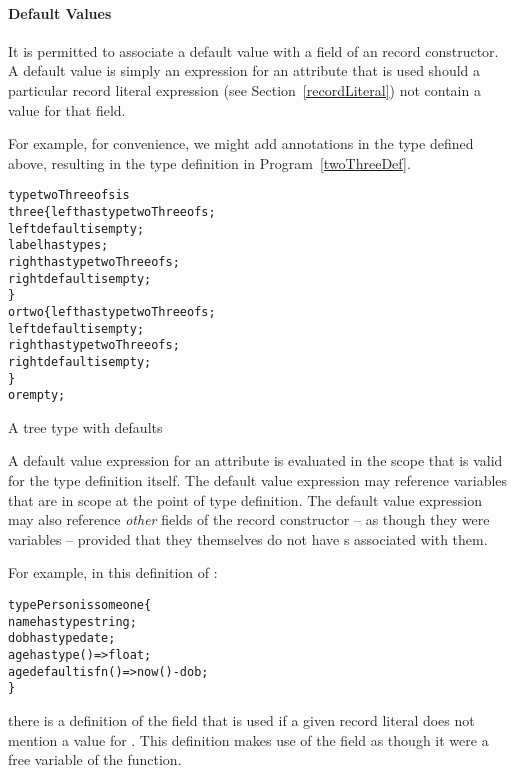 \paragraph{Default Values}
\label{defaultValues}

It is permitted to associate a default value with a field of an record constructor. A default value is simply an expression for an attribute that is used should a particular record literal expression (see Section~\vref{recordLiteral}) not contain a value for that field.

For example, for convenience, we might add  annotations in the  type defined above, resulting in the type definition in Program~\vref{twoThreeDef}.
\begin{program}
\begin{alltt}
type twoThree of s is
  three\{ left has type twoThree of s;
         left default is empty;
         label has type s;
         right has type twoThree of s;
         right default is empty;
       \}
  or two\{ left has type twoThree of s; 
         left default is empty;
         right has type twoThree of s;
         right default is empty;
       \}
  or empty;
\end{alltt}
\caption{A  tree type with defaults}\label{twoThreeDef}
\end{program}

\begin{aside}
A default value expression for an attribute is evaluated in the scope that is valid for the type definition itself. The default value expression may reference variables that are in scope at the point of type definition. The default value expression may also reference \emph{other} fields of the record constructor -- as though they were variables -- provided that they themselves do not have s associated with them.

For example, in this definition of :
\begin{alltt}
type Person is someone\{
  name has type string;
  dob has type date;
  age has type ()=>float;
  age default is fn() => now()-dob;
\}
\end{alltt}
there is a  definition of the  field that is used if a given  record literal does not mention a value for . This  definition makes use of the  field as though it were a free variable of the  function.
\end{aside}

